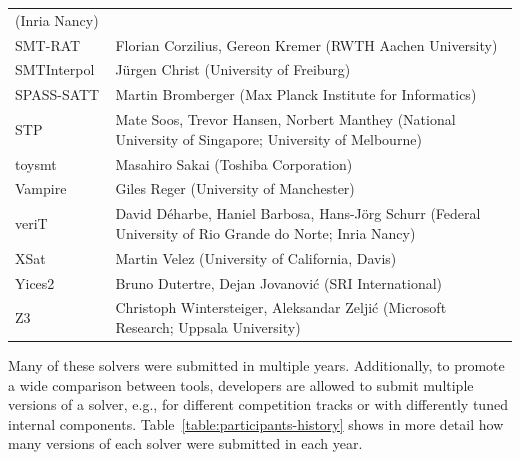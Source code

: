 \documentclass[dvipsnames,table,twoside,11pt]{article}
\begin{document}
\begin{table}
\begin{tabular}{lp{11.5cm}}
                        (Inria Nancy)\\
    SMT-RAT~\cite{DBLP:conf/sat/CorziliusKJSA15} & Florian Corzilius, Gereon Kremer
                        (RWTH Aachen University)\\
    SMTInterpol~\cite{DBLP:conf/spin/ChristHN12} & J\"urgen Christ
                        (University of Freiburg)\\
    SPASS-SATT         & Martin Bromberger
                        (Max Planck Institute for Informatics)\\
    STP~\cite{ganesh07} & Mate Soos, Trevor Hansen, Norbert Manthey
                        (National University of Singapore; University of Melbourne)\\
    toysmt             & Masahiro Sakai
                        (Toshiba Corporation)\\
    Vampire~\cite{DBLP:conf/cav/KovacsV13} & Giles Reger
                        (University of Manchester)\\
    veriT~\cite{DBLP:conf/cade/BoutonODF09} & David D\'eharbe, Haniel Barbosa, Hans-J\"org Schurr
                        (Federal University of Rio Grande do Norte; Inria Nancy)\\
    XSat~\cite{DBLP:conf/cav/FuS16} & Martin Velez
                        (University of California, Davis)\\
    Yices2~\cite{Dutertre:cav2014} & Bruno Dutertre, Dejan Jovanovi\'c
                        (SRI International)\\
    Z3~\cite{DBLP:conf/tacas/MouraB08} & Christoph Wintersteiger, Aleksandar Zelji\'c
                        (Microsoft Research; Uppsala University)\\
    \bottomrule
  \end{tabular}
\end{table}

Many of these solvers were submitted in multiple years.  Additionally,
to promote a wide comparison between tools, developers are allowed to
submit multiple versions of a solver, e.g., for different competition
tracks or with differently tuned internal components.
Table~\ref{table:participants-history} shows in more detail how many
versions of each solver were submitted in each year.
\end{document}
